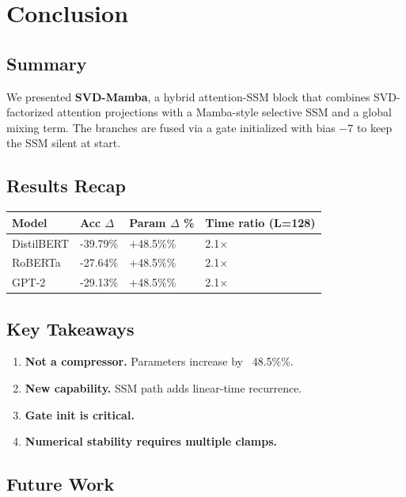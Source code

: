 
\section{Conclusion}

\subsection{Summary}

We presented \textbf{SVD-Mamba}, a hybrid attention-SSM block that combines 
SVD-factorized attention projections with a Mamba-style selective SSM and 
a global mixing term. The branches are fused via a gate initialized with 
bias $-7$ to keep the SSM silent at start.

\subsection{Results Recap}

\begin{table}[H]
\centering
\small
\begin{tabular}{llll}
\toprule
\textbf{Model} & \textbf{Acc $\Delta$} & \textbf{Param $\Delta$ \%} & \textbf{Time ratio (L=128)} \\
\midrule
DistilBERT & -39.79\% & +48.5\%\% & 2.1$\times$ \\
RoBERTa & -27.64\% & +48.5\%\% & 2.1$\times$ \\
GPT-2 & -29.13\% & +48.5\%\% & 2.1$\times$ \\
\bottomrule
\end{tabular}
\end{table}

\subsection{Key Takeaways}

\begin{enumerate}
\item \textbf{Not a compressor.} Parameters increase by ~48.5\%\%.
\item \textbf{New capability.} SSM path adds linear-time recurrence.
\item \textbf{Gate init is critical.}
\item \textbf{Numerical stability requires multiple clamps.}

\end{enumerate}
\subsection{Future Work}

